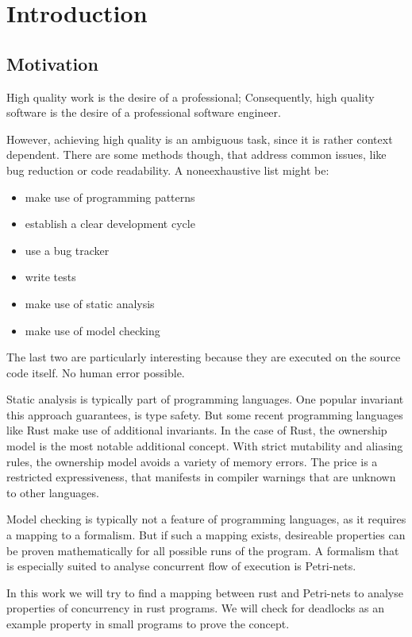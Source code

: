 \chapter{Introduction}
\label{introduction}
\section{Motivation}
High quality work is the desire of a professional;
Consequently, high quality software is the desire of a professional software engineer.

However, achieving high quality is an ambiguous task, since it is rather context dependent.
There are some methods though, that address common issues, like bug reduction or code readability.
A noneexhaustive list might be:
\begin{itemize}
  \setlength\itemsep{-0.3em}
  \item make use of programming patterns
  \item establish a clear development cycle
  \item use a bug tracker
  \item write tests
  \item make use of static analysis
  \item make use of model checking
\end{itemize}
The last two are particularly interesting because they are executed on the source code itself.
No human error possible.

Static analysis is typically part of programming languages.
One popular invariant this approach guarantees, is type safety.
But some recent programming languages like Rust\cite{} make use of additional invariants.
In the case of Rust, the ownership model is the most notable additional concept.
With strict mutability and aliasing rules, the ownership model avoids a variety of memory errors.
The price is a restricted expressiveness, that manifests in compiler warnings that are unknown to other languages.

Model checking is typically not a feature of programming languages, as it requires a mapping to a formalism.
But if such a mapping exists, desireable properties can be proven mathematically for all possible runs of the program.
A formalism that is especially suited to analyse concurrent flow of execution is Petri-nets.

In this work we will try to find a mapping between rust and Petri-nets to analyse properties of concurrency in rust programs.
We will check for deadlocks as an example property in small programs to prove the concept.

